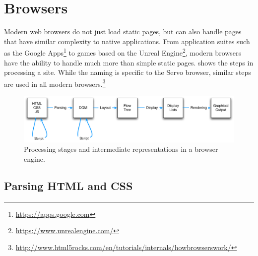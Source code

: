 
\section{Browsers}
\label{sec:browsers}

Modern web browsers do not just load static pages, but can also handle pages that have similar
complexity to native applications.
From application suites such as the Google Apps\footnote{\url{https://apps.google.com}} to games
based on the Unreal Engine\footnote{\url{https://www.unrealengine.com/}},
modern browsers have the ability to handle much more than simple static pages.
 shows the steps in processing a site.
While the naming is specific to the Servo browser, similar steps are used in all modern browsers.\footnote{\url{http://www.html5rocks.com/en/tutorials/internals/howbrowserswork/}}
\begin{figure}[ht]
  \begin{center}
    \includegraphics[scale=0.7]{pics/browser}
  \end{center}%
  \caption{Processing stages and intermediate representations in a browser engine.}
  \label{fig:browser}
\end{figure}%

\subsection{Parsing HTML and CSS}

